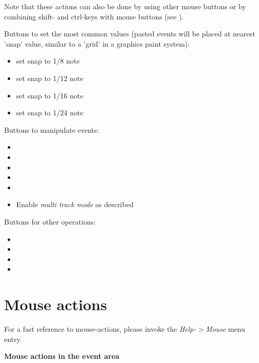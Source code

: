 \documentclass[letterpaper]{report}
\begin{document}
Note that these actions can also be done by using other mouse buttons or
by combining shift- and ctrl-keys with mouse buttons
(see ).


Buttons to set the most common  values (pasted events
will be placed at nearest 'snap' value, similar to a 'grid' in a graphics
paint system):
\begin{itemize}
\item set snap to 1/8 note
\item set snap to 1/12 note
\item set snap to 1/16 note
\item set snap to 1/24 note
\end{itemize}

Buttons to manipulate events:
\begin{itemize}
\item {}
\item {}
\item {}
\item {}
\item {}
\item Enable {\em multi track mode} as described 
\end{itemize}

Buttons for other operations:
\begin{itemize}
\item {}
\item {}
\item {}
\item {}
\end{itemize}



\section{Mouse actions}\label{mouseact}

For a fast reference to mouse-actions, please invoke the {\em Help-$>$Mouse}
menu entry.

{\bf Mouse actions in the event area}
\end{document}

